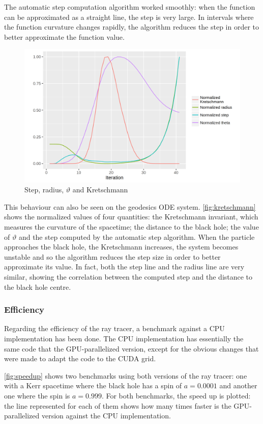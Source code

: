 The automatic step computation algorithm worked smoothly: when the function can be approximated as a straight line, the step is very large. In intervals where the function curvature changes rapidly, the algorithm reduces the step in order to better approximate the function value.

\begin{figure}[bth]
	\myfloatalign
	\includegraphics[width=0.7\linewidth]{gfx/kretschmann}
	\caption[Step, $r$, $\vartheta$ and Kretschmann]{Step, radius, $\vartheta$ and Kretschmann}
	\label{fig:kretschmann}
\end{figure}

This behaviour can also be seen on the geodesics \ac{ODE} system. \autoref{fig:kretschmann} shows the normalized values of four quantities: the Kretschmann invariant, which measures the curvature of the spacetime; the distance to the black hole; the value of $\vartheta$ and the step computed by the automatic step algorithm. When the particle approaches the black hole, the Kretschmann increases, the system becomes unstable and so the algorithm reduces the step size in order to better approximate its value. In fact, both the step line and the radius line are very similar, showing the correlation between the computed step and the distance to the black hole centre.

\subsubsection*{Efficiency}

Regarding the efficiency of the ray tracer, a benchmark against a \ac{CPU} implementation has been done. The \ac{CPU} implementation has essentially the same code that the \ac{GPU}-parallelized version, except for the obvious changes that were made to adapt the code to the \ac{CUDA} grid.

\autoref{fig:speedup} shows two benchmarks using both versions of the ray tracer: one with a Kerr spacetime where the black hole has a spin of $a = 0.0001$ and another one where the spin is $a = 0.999$. For both benchmarks, the speed up is plotted: the line represented for each of them shows how many times faster is the \ac{GPU}-parallelized version against the \ac{CPU} implementation.

